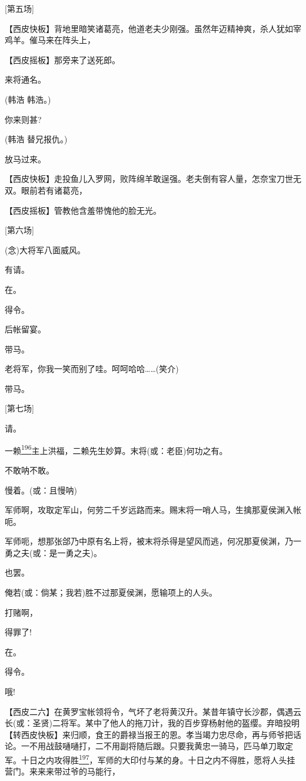 {[}第五场{]}

【西皮快板】背地里暗笑诸葛亮，他道老夫少刚强。虽然年迈精神爽，杀人犹如宰鸡羊。催马来在阵头上，

【西皮摇板】那旁来了送死郎。

来将通名。

(韩浩 韩浩。)

你来则甚?

(韩浩 替兄报仇。)

放马过来。

【西皮快板】走投鱼儿入罗网，败阵绵羊敢逞强。老夫倒有容人量，怎奈宝刀世无双。眼前若有诸葛亮，

【西皮摇板】管教他含羞带愧他的脸无光。

{[}第六场{]}

(念)大将军八面威风。

有请。

在。

得令。

后帐留宴。

带马。

老将军，你我一笑而别了哇。呵呵哈哈\ldots{}\ldots{}(笑介)

带马。

{[}第七场{]}

请。

一赖\protect\hyperlink{fn196}{\textsuperscript{196}}主上洪福，二赖先生妙算。末将(或：老臣)何功之有。

不敢呐不敢。

慢着。(或：且慢呐)

军师啊，攻取定军山，何劳二千岁远路而来。赐末将一哨人马，生擒那夏侯渊入帐呃。

军师呃，想那张郃乃中原有名上将，被末将杀得是望风而逃，何况那夏侯渊，乃一勇之夫(或：是一勇之夫)。

也罢。

俺若(或：倘某；我若)胜不过那夏侯渊，愿输项上的人头。

打赌啊，

得罪了!

在。

得令。

哦!

【西皮二六】在黄罗宝帐领将令，气坏了老将黄汉升。某昔年镇守长沙郡，偶遇云长(或：圣贤)二将军。某中了他人的拖刀计，我的百步穿杨射他的盔缨。弃暗投明【转西皮快板】来归顺，食王的爵禄当报王的恩。孝当竭力忠尽命，再与师爷把话论。一不用战鼓嗵嗵打，二不用副将随后跟。只要我黄忠一骑马，匹马单刀取定军。十日之内攻得胜\protect\hyperlink{fn197}{\textsuperscript{197}}，军师的大印付与某的身。十日之内不得胜，愿将人头挂营门。来来来带过爷的马能行，

